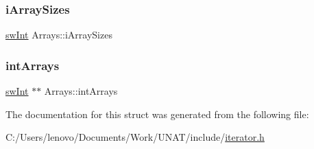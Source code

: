 \subsubsection{\texorpdfstring{iArraySizes}{iArraySizes}}
{\footnotesize\ttfamily \mbox{\hyperlink{include_2swMacro_8h_a113cf5f6b5377cdf3fac6aa4e443e9aa}{sw\+Int}} Arrays\+::i\+Array\+Sizes}

\mbox{\label{structArrays_a3b8e8309d07651cb70a0a694855b804f}} 
\subsubsection{\texorpdfstring{intArrays}{intArrays}}
{\footnotesize\ttfamily \mbox{\hyperlink{include_2swMacro_8h_a113cf5f6b5377cdf3fac6aa4e443e9aa}{sw\+Int}} $\ast$$\ast$ Arrays\+::int\+Arrays}



The documentation for this struct was generated from the following file\+:\begin{DoxyCompactItemize}
\item 
C\+:/\+Users/lenovo/\+Documents/\+Work/\+U\+N\+A\+T/include/\mbox{\hyperlink{include_2iterator_8h}{iterator.\+h}}\end{DoxyCompactItemize}
